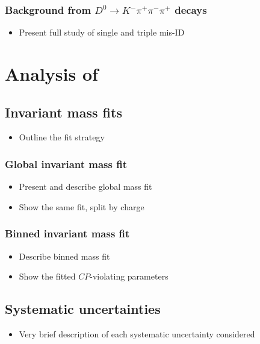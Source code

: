 \documentclass[12pt, a4paper, notitlepage, onecolumn]{article}
\begin{document}
\subsubsection{Background from \texorpdfstring{$D^0\to K^-\pi^+\pi^-\pi^+$}{D02Kpipipi} decays}
  \begin{itemize}[nosep]
    \setlength{\itemindent}{2.5em}
    \item[\textasteriskcentered]{Present full study of single and triple mis-ID}
  \end{itemize}

\section{Analysis of \texorpdfstring{}{B2DhD2KKpipi}}
\label{section_Analysis_of_B2DhD2KKpipi}
\subsection{Invariant mass fits}
  \begin{itemize}[nosep]
    \setlength{\itemindent}{2em}
    \item[\textendash]{Outline the fit strategy}
  \end{itemize}
\subsubsection{Global invariant mass fit}
  \begin{itemize}[nosep]
    \setlength{\itemindent}{2.5em}
    \item[\textasteriskcentered]{Present and describe global mass fit}
    \item[\textasteriskcentered]{Show the same fit, split by charge}
  \end{itemize}
\subsubsection{Binned invariant mass fit}
  \begin{itemize}[nosep]
    \setlength{\itemindent}{2.5em}
    \item[\textasteriskcentered]{Describe binned mass fit}
    \item[\textasteriskcentered]{Show the fitted $C\!P$-violating parameters}
  \end{itemize}
\subsection{Systematic uncertainties}
  \begin{itemize}[nosep]
    \setlength{\itemindent}{2em}
    \item[\textendash]{Very brief description of each systematic uncertainty considered}
  \end{itemize}
\end{document}
